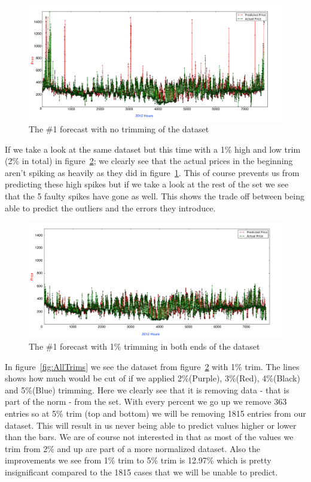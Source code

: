 \begin{figure}[H]
\centering
\includegraphics[width=\linewidth]{billeder/PriceExperimentalAnalysis/NoTrimming.png}
\caption{The \#1 forecast with no trimming of the dataset}
\label{fig:NoTrim}
\end{figure}

If we take a look at the same dataset but this time with a 1\% high and low trim (2\% in total) in figure~\ref{fig:1PTrim}; we clearly see that the actual prices in the beginning aren't spiking as heavily as they did in figure~\ref{fig:NoTrim}. This of course prevents us from predicting these high spikes but if we take a look at the rest of the set we see that the 5 faulty spikes have gone as well. This shows the trade off between being able to predict the outliers and the errors they introduce.

\begin{figure}[H]
\centering
\includegraphics[width=\linewidth]{billeder/PriceExperimentalAnalysis/1PTrim.png}
\caption{The \#1 forecast with 1\% trimming in both ends of the dataset}
\label{fig:1PTrim}
\end{figure}

In figure~\ref{fig:AllTrims} we see the dataset from figure~\ref{fig:1PTrim} with 1\% trim. The lines shows how much would be cut of if we applied 2\%(Purple), 3\%(Red), 4\%(Black) and 5\%(Blue) trimming. Here we clearly see that it is removing data - that is part of the norm - from the set. With every percent we go up we remove 363 entries so at 5\% trim (top and bottom) we will be removing 1815 entries from our dataset. This will result in us never being able to predict values higher or lower than the bars. We are of course not interested in that as most of the values we trim from 2\% and up are part of a more normalized dataset. Also the improvements we see from 1\% trim to 5\% trim is 12.97\% which is pretty insignificant compared to the 1815 cases that we will be unable to predict.

